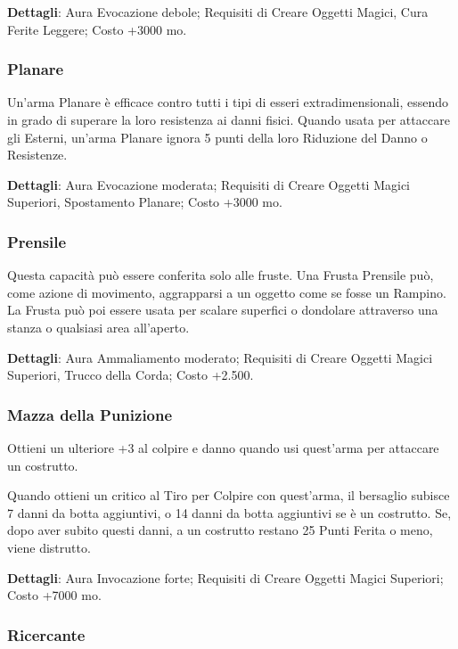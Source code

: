 \begin{multicols}{2}
	\textbf{Dettagli}: Aura Evocazione debole; Requisiti di Creare Oggetti Magici, Cura Ferite Leggere; Costo +3000 mo.

	\subsubsection*{Planare}

	Un'arma Planare è efficace contro tutti i tipi di esseri extradimensionali, essendo in grado di superare la loro resistenza ai danni fisici. Quando usata per attaccare gli Esterni, un'arma Planare ignora 5 punti della loro Riduzione del Danno o Resistenze.

	\textbf{Dettagli}: Aura Evocazione moderata; Requisiti di Creare Oggetti Magici Superiori, Spostamento Planare; Costo +3000 mo.

	\subsubsection*{Prensile}

	Questa capacità può essere conferita solo alle fruste. Una Frusta Prensile può, come azione di movimento, aggrapparsi a un oggetto come se fosse un Rampino. La Frusta può poi essere usata per scalare superfici o dondolare attraverso una stanza o qualsiasi area all'aperto.

	\textbf{Dettagli}: Aura Ammaliamento moderato; Requisiti di Creare Oggetti Magici Superiori, Trucco della Corda; Costo +2.500.

	\subsubsection*{Mazza della Punizione}

	Ottieni un ulteriore +3 al colpire e danno quando usi quest'arma per attaccare un costrutto.

	Quando ottieni un critico al Tiro per Colpire con quest'arma, il bersaglio subisce 7 danni da botta aggiuntivi, o 14 danni da botta aggiuntivi se è un costrutto. Se, dopo aver subito questi danni, a un costrutto restano 25 Punti Ferita o meno, viene distrutto.

	\textbf{Dettagli}: Aura Invocazione forte; Requisiti di Creare Oggetti Magici Superiori; Costo +7000 mo.

	\subsubsection*{Ricercante}


\end{multicols}
